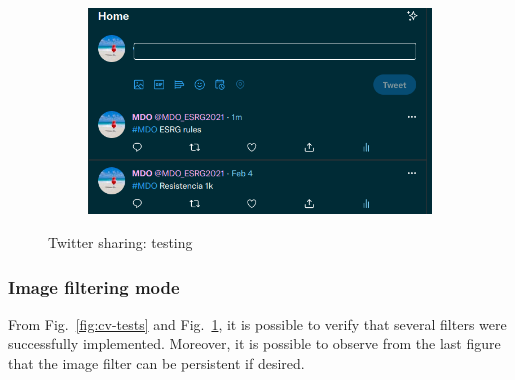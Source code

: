 \begin{figure}[htb!]
\begin{subfigure}[t]{.4\textwidth}
\end{subfigure}
%
\hspace{.05\textwidth}
%
  \begin{subfigure}[t]{.42\textwidth}
  \includegraphics[width=\textwidth]{img/ui-test-sharing-mode2.png}%
\end{subfigure}
  \caption{Twitter sharing: testing}%
  \label{fig:twitter-test}
\end{figure}
%

\subsubsection{Image filtering mode}
\label{sec:image-filtering-mode}
From Fig.~\ref{fig:cv-tests} and Fig.~\ref{fig:twitter-test}, it is possible to
verify that several filters were successfully implemented. Moreover, it is
possible to observe from the last figure that the image filter can be persistent
if desired.

